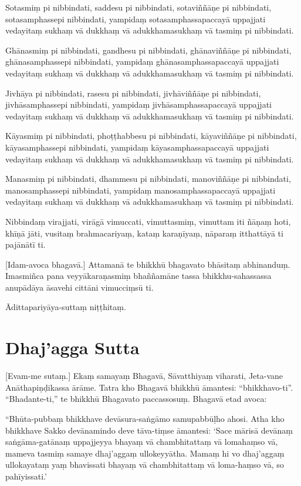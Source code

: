 Sotasmiṃ pi nibbindati, saddesu pi nibbindati, sotaviññāṇe pi
nibbindati, sotasamphassepi nibbindati, yampidaṃ sotasamphassapaccayā
uppajjati vedayitaṃ sukhaṃ vā dukkhaṃ vā adukkhamasukhaṃ vā tasmiṃ pi
nibbindati.

Ghānasmiṃ pi nibbindati, gandhesu pi nibbindati, ghānaviññāṇe pi
nibbindati, ghānasamphassepi nibbindati, yampidaṃ ghānasamphassapaccayā
uppajjati vedayitaṃ sukhaṃ vā dukkhaṃ vā adukkhamasukhaṃ vā tasmiṃ pi
nibbindati.

Jivhāya pi nibbindati, rasesu pi nibbindati, jivhāviññāṇe pi nibbindati,
jivhāsamphassepi nibbindati, yampidaṃ jivhāsamphassapaccayā uppajjati
vedayitaṃ sukhaṃ vā dukkhaṃ vā adukkhamasukhaṃ vā tasmiṃ pi nibbindati.

Kāyasmiṃ pi nibbindati, phoṭṭhabbesu pi nibbindati, kāyaviññāṇe pi
nibbindati, kāyasamphassepi nibbindati, yampidaṃ kāyasamphassapaccayā
uppajjati vedayitaṃ sukhaṃ vā dukkhaṃ vā adukkhamasukhaṃ vā tasmiṃ pi
nibbindati.

Manasmiṃ pi nibbindati, dhammesu pi nibbindati, manoviññāṇe pi
nibbindati, manosamphassepi nibbindati, yampidaṃ manosamphassapaccayā
uppajjati vedayitaṃ sukhaṃ vā dukkhaṃ vā adukkhamasukhaṃ vā tasmiṃ pi
nibbindati.

Nibbindaṃ virajjati, virāgā vimuccati, vimuttasmiṃ, vimuttam iti ñāṇaṃ
hoti, khīṇā jāti, vusitaṃ brahmacariyaṃ, kataṃ karaṇīyaṃ, nāparaṃ
itthattāyā ti pajānātī ti.

[Idam-avoca bhagavā.] Attamanā te bhikkhū bhagavato bhāsitaṃ abhinanduṃ.
Imasmiñca pana veyyākaraṇasmiṃ bhaññamāne tassa bhikkhu-sahassassa
anupādāya āsavehi cittāni vimucciṃsū ti.

Ādittapariyāya-suttaṃ niṭṭhitaṃ.


\section{Dhaj'agga Sutta}


[Evam-me sutaṃ.] Ekaṃ samayaṃ Bhagavā, Sāvatthiyaṃ viharati, Jeta-vane
Anāthapiṇḍikassa ārāme. Tatra kho Bhagavā bhikkhū āmantesi: “bhikkhavo-ti”.
“Bhadante-ti,” te bhikkhū Bhagavato paccassosuṃ. Bhagavā etad avoca:

“Bhūta-pubbaṃ bhikkhave devāsura-saṅgāmo samupabbūḷho ahosi. Atha kho bhikkhave
Sakko devānamindo deve tāva-tiṃse āmantesi: ‘Sace mārisā devānaṃ saṅgāma-gatānaṃ
uppajjeyya bhayaṃ vā chambhitattaṃ vā lomahaṃso vā, mameva tasmiṃ samaye
dhaj’aggaṃ ullokeyyātha. Mamaṃ hi vo dhaj’aggaṃ ullokayataṃ yaṃ bhavissati
bhayaṃ vā chambhitattaṃ vā loma-haṃso vā, so pahīyissati.’

